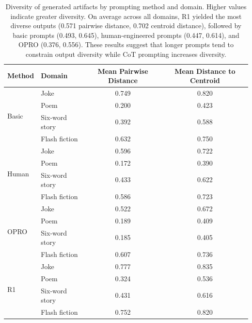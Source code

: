 \documentclass[phd,electronic,oneside,twosidetoc,letterpaper,chaptercenter,parttop,lof]{byumsphd}
\begin{document}
\begin{table}[t]
\centering
\begin{tabular}{llcc}
\toprule
\textbf{Method} & \textbf{Domain} & \textbf{Mean Pairwise Distance} & \textbf{Mean Distance to Centroid} \\
\midrule
\multirow{4}{*}{Basic} & Joke & 0.749 & 0.820 \\
  & Poem & 0.200 & 0.423 \\
  & Six-word story & 0.392 & 0.588 \\
  & Flash fiction & 0.632 & 0.750 \\
\midrule
\multirow{4}{*}{Human} & Joke & 0.596 & 0.722 \\
  & Poem & 0.172 & 0.390 \\
  & Six-word story & 0.433 & 0.622 \\
  & Flash fiction & 0.586 & 0.723 \\
\midrule
\multirow{4}{*}{OPRO} & Joke & 0.522 & 0.672 \\
  & Poem & 0.189 & 0.409 \\
  & Six-word story & 0.185 & 0.405 \\
  & Flash fiction & 0.607 & 0.736 \\
\midrule
\multirow{4}{*}{R1} & Joke & 0.777 & 0.835 \\
  & Poem & 0.324 & 0.536 \\
  & Six-word story & 0.431 & 0.616 \\
  & Flash fiction & 0.752 & 0.820 \\
\bottomrule
\end{tabular}

\caption{Diversity of generated artifacts by prompting method and domain. Higher values indicate greater diversity. On average across all domains, R1 yielded the most diverse outputs (0.571 pairwise distance, 0.702 centroid distance), followed by basic prompts (0.493, 0.645), human-engineered prompts (0.447, 0.614), and OPRO (0.376, 0.556). These results suggest that longer prompts tend to constrain output diversity while CoT prompting increases diversity.}
\label{tab:diversity_metrics}
\end{table}
\end{document}
